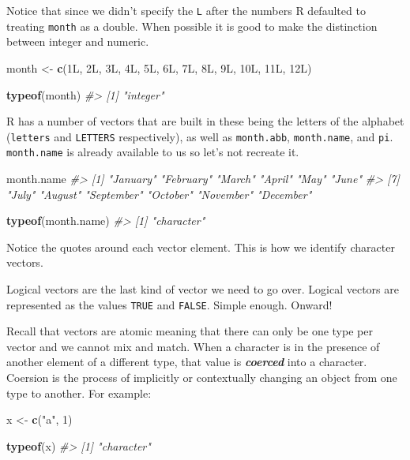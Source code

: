 \documentclass[
]{book}
\newenvironment{Shaded}{\begin{snugshade}}{\end{snugshade}}
\newcommand{\CommentTok}[1]{\textcolor[rgb]{0.56,0.35,0.01}{\textit{#1}}}
\newcommand{\DecValTok}[1]{\textcolor[rgb]{0.00,0.00,0.81}{#1}}
\newcommand{\KeywordTok}[1]{\textcolor[rgb]{0.13,0.29,0.53}{\textbf{#1}}}
\newcommand{\NormalTok}[1]{#1}
\newcommand{\StringTok}[1]{\textcolor[rgb]{0.31,0.60,0.02}{#1}}
\begin{document}
Notice that since we didn't specify the \texttt{L} after the numbers R defaulted to treating \texttt{month} as a double. When possible it is good to make the distinction between integer and numeric.

\begin{Shaded}
\begin{Highlighting}[]
\NormalTok{month \textless{}{-}}\StringTok{ }\KeywordTok{c}\NormalTok{(1L, 2L, 3L, 4L, 5L, 6L, 7L, 8L, 9L, 10L, 11L, 12L)}

\KeywordTok{typeof}\NormalTok{(month)}
\CommentTok{\#\textgreater{} [1] "integer"}
\end{Highlighting}
\end{Shaded}

R has a number of vectors that are built in these being the letters of the alphabet (\texttt{letters} and \texttt{LETTERS} respectively), as well as \texttt{month.abb}, \texttt{month.name}, and \texttt{pi}. \texttt{month.name} is already available to us so let's not recreate it.

\begin{Shaded}
\begin{Highlighting}[]
\NormalTok{month.name}
\CommentTok{\#\textgreater{}  [1] "January"   "February"  "March"     "April"     "May"       "June"     }
\CommentTok{\#\textgreater{}  [7] "July"      "August"    "September" "October"   "November"  "December"}

\KeywordTok{typeof}\NormalTok{(month.name)}
\CommentTok{\#\textgreater{} [1] "character"}
\end{Highlighting}
\end{Shaded}

Notice the quotes around each vector element. This is how we identify character vectors.

Logical vectors are the last kind of vector we need to go over. Logical vectors are represented as the values \texttt{TRUE} and \texttt{FALSE}. Simple enough. Onward!

Recall that vectors are atomic meaning that there can only be one type per vector and we cannot mix and match. When a character is in the presence of another element of a different type, that value is \emph{\textbf{coerced}} into a character. Coersion is the process of implicitly or contextually changing an object from one type to another. For example:

\begin{Shaded}
\begin{Highlighting}[]
\NormalTok{x \textless{}{-}}\StringTok{ }\KeywordTok{c}\NormalTok{(}\StringTok{"a"}\NormalTok{, }\DecValTok{1}\NormalTok{)}

\KeywordTok{typeof}\NormalTok{(x)}
\CommentTok{\#\textgreater{} [1] "character"}
\end{Highlighting}
\end{Shaded}
\end{document}
